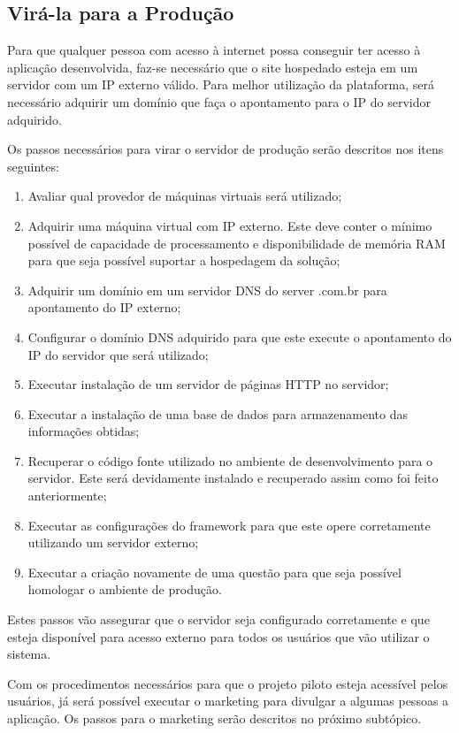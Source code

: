 \subsection{Virá-la para a Produção}
\label{sub:definir_tecnologia}
Para que qualquer pessoa com acesso à internet possa conseguir ter acesso à aplicação desenvolvida, faz-se necessário que
o site hospedado esteja em um servidor com um IP externo válido. Para melhor utilização da plataforma, será necessário adquirir um domínio
que faça o apontamento para o IP do servidor adquirido. 

Os passos necessários para virar o servidor de produção serão descritos nos itens seguintes:

\begin{enumerate}
    \item Avaliar qual provedor de máquinas virtuais será utilizado;
    \item Adquirir uma máquina virtual com IP externo. Este deve conter o mínimo possível de capacidade de processamento e
        disponibilidade de memória RAM para que seja possível suportar a hospedagem da solução;
    \item Adquirir um domínio em um servidor DNS do server .com.br para apontamento do IP externo;
    \item Configurar o domínio DNS adquirido para que este execute o apontamento do IP do servidor que será utilizado;
    \item Executar instalação de um servidor de páginas HTTP no servidor;
    \item Executar a instalação de uma base de dados para armazenamento das informações obtidas;
    \item Recuperar o código fonte utilizado no ambiente de desenvolvimento para o servidor. Este será devidamente
        instalado e recuperado assim como foi feito anteriormente;
    \item Executar as configurações do framework para que este opere corretamente utilizando um servidor externo;
    \item Executar a criação novamente de uma questão para que seja possível homologar o ambiente de produção.
\end{enumerate}

Estes passos vão assegurar que o servidor seja configurado corretamente e que esteja disponível para acesso externo para
todos os usuários que vão utilizar o sistema.

Com os procedimentos necessários para que o projeto piloto esteja acessível pelos usuários, já será possível executar o marketing
para divulgar a algumas pessoas a aplicação. Os passos para o marketing serão descritos no próximo subtópico.

